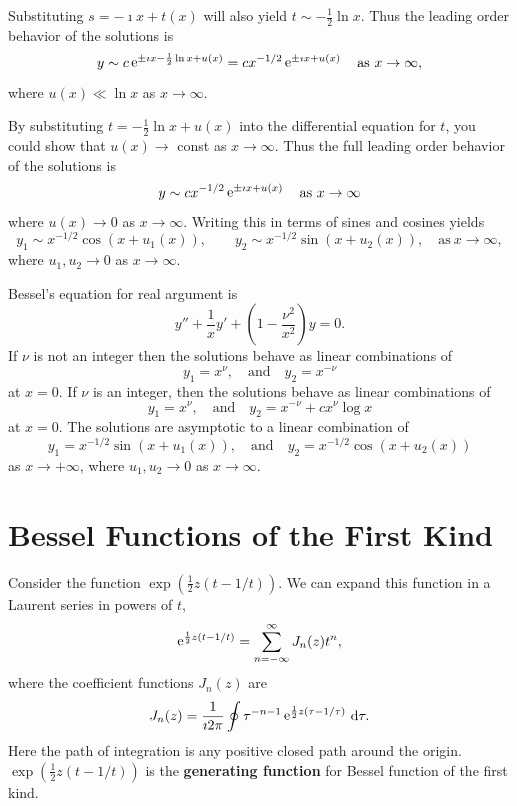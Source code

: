 Substituting $s = - \imath x + t(x)$ will also yield $t \sim -\frac{1}{2} \ln x$.
Thus the leading order behavior of the solutions is
\[ 
y \sim c \mathop{\mathrm{e}}\nolimits^{\pm \imath x - \frac{1}{2} \ln x + u(x)} 
= c x^{-1/2} \mathop{\mathrm{e}}\nolimits^{\pm \imath x + u(x)} \quad \mathrm{as}\ x \to \infty,
\]
where $u(x) \ll \ln x$ as $x \to \infty$.

By substituting $t = -\frac{1}{2} \ln x + u(x)$ into the differential equation
for $t$, you could show that $u(x) \to $ const as $x \to \infty$.  Thus the
full leading order behavior of the solutions is
\[ 
y \sim c x^{-1/2} \mathop{\mathrm{e}}\nolimits^{\pm \imath x + u(x)} \quad \mathrm{as}\ x \to \infty
\]
where $u(x) \to 0$ as $x \to \infty$.
Writing this in terms of sines and cosines yields
\[ 
y_1 \sim x^{-1/2} \cos(x + u_1(x)), \qquad
y_2 \sim x^{-1/2} \sin(x + u_2(x)), \quad \mathrm{as}\ x \to \infty,
\]
where $u_1,u_2 \to 0$ as $x \to \infty$.




\begin{Result}
  Bessel's equation for real argument is
  \[ 
  y'' + \frac{1}{x} y' + \left( 1 - \frac{\nu^2}{x^2} \right) y = 0.
  \]
  If $\nu$ is not an integer then the solutions behave as linear combinations
  of
  \[ 
  y_1 = x^\nu, \quad \mathrm{and} \quad y_2 = x^{-\nu}
  \]
  at $x = 0$.
  If $\nu$ is an integer, then the solutions behave as linear combinations of
  \[ 
  y_1 = x^\nu, \quad \mathrm{and} \quad y_2 = x^{-\nu} + c x^\nu \log x
  \]
  at $x = 0$.
  The solutions are asymptotic to a linear combination of
  \[ 
  y_1 = x^{-1/2}\sin(x + u_1(x)), \quad \mathrm{and} \quad
  y_2 = x^{-1/2}\cos(x + u_2(x))
  \]
  as $x \to +\infty$, where $u_1,u_2 \to 0$ as $x \to \infty$.
\end{Result}











\section{Bessel Functions of the First Kind}

Consider the function $\exp(\frac{1}{2} z (t - 1/t))$.  We can expand this
function in a Laurent series in powers of $t$,
\[ 
\mathop{\mathrm{e}}\nolimits^{\frac{1}{2} z (t - 1/t)} = \sum_{n = -\infty}^\infty J_n(z) t^n,
\]
where the coefficient functions $J_n(z)$ are 
\[ 
J_n(z) = \frac{1}{\imath 2 \pi} \oint \tau^{-n-1} \mathop{\mathrm{e}}\nolimits^{\frac{1}{2} z (\tau-1/\tau)}\,\mathrm{d} \tau.
\]
Here the path of integration is any positive closed path around the origin.
$\exp(\frac{1}{2} z (t - 1/t))$ is the \textbf{generating function}
for Bessel function of the first kind.





